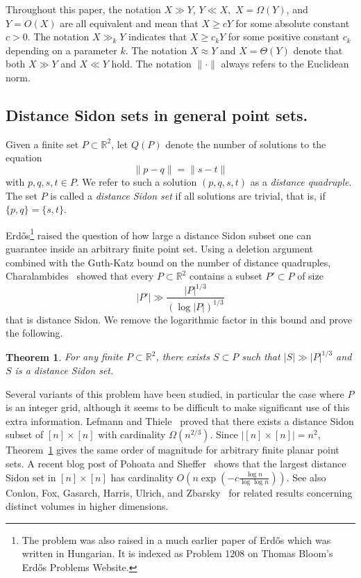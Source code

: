 \documentclass[11pt,oneside]{amsart}
\numberwithin{exercise}{subsection}
\newtheorem{theorem}{Theorem}
\begin{document}
Throughout this paper, the notation $X\gg Y$, $Y \ll X,$ $X=\Omega(Y)$, and $Y=O(X)$ are all equivalent and mean that $X\geq cY$ for some absolute constant $c>0$. The notation $X \gg_k Y$ indicates that $X \geq c_kY$ for some positive constant $c_k$ depending on a parameter $k$. The notation $X \approx Y$ and $X=\Theta (Y)$ denote that both $X \gg Y$ and $X \ll Y$ hold. The notation $\| \cdot \|$ always refers to the Euclidean norm.

\subsection*{Distance Sidon sets in general point sets.}
Given a finite set $P \subset \mathbb R^2$, let $Q(P)$ denote the number of solutions to the equation
\[
\|p-q\|=\|s-t\|
\]
with $p,q,s,t \in P$. We refer to such a solution $(p,q,s,t)$ as a \emph{distance quadruple}. The set $P$ is called a \emph{distance Sidon set} if all solutions are trivial, that is, if $\{p,q\}=\{s,t\}$.

Erd\H{o}s\footnote{The problem was also raised in a much earlier paper of Erd\H{o}s \cite{Er57} which was written in Hungarian. It is indexed as Problem 1208 on Thomas Bloom's Erd\H{o}s Problems Website.} \cite{Er80} raised the question of how large a distance Sidon subset one can guarantee inside an arbitrary finite point set. Using a deletion argument combined with the Guth-Katz \cite{GuKa15} bound on the number of distance quadruples, Charalambides~\cite{charalambides2013note} showed that every $P \subset \mathbb R^2$ contains a subset $P' \subset P$ of size
\[
|P'| \gg \frac{|P|^{1/3}}{(\log |P|)^{1/3}}
\]
that is distance Sidon. We remove the logarithmic factor in this bound and prove the following.

\begin{theorem}\label{thm:main}
For any finite $P \subset \mathbb R^2$, there exists $S \subset P$ such that $|S| \gg |P|^{1/3}$ and $S$ is a distance Sidon set.
\end{theorem}
Several variants of this problem have been studied, in particular the case where $P$ is an integer grid, although it seems to be difficult to make significant use of this extra information. Lefmann and Thiele~\cite{LeTh95} proved that there exists a distance Sidon subset of $[n] \times [n]$ with cardinality $\Omega(n^{2/3})$. Since $|[n] \times [n]|=n^2$, Theorem~\ref{thm:main} gives the same order of magnitude for arbitrary finite planar point sets. A recent blog post of Pohoata and Sheffer~\cite{PohoataSheffer2026} shows that the largest distance Sidon set in $[n] \times [n]$ has cardinality $O \left (n \exp\left( -c \frac{\log n}{\log\log n} \right ) \right )$. See also Conlon, Fox, Gasarch, Harris, Ulrich, and Zbarsky~\cite{conlon2015distinct} for related results concerning distinct volumes in higher dimensions.
\end{document}
